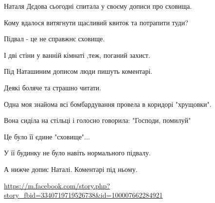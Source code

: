 Наталя  Дєдова сьогодні спитала у своєму дописи про сховища. 

Кому вдалося витягнути щасливий квиток та потрапити туди?

Підвал - це  не справжнє сховище.

І дві стіни у ванній кімнаті ,теж,  поганий захист.

Під Наташиним дописом  люди пишуть коментарі.

Деякі  боляче та страшно читати.

Одна моя знайома всі бомбардування провела в коридорі "хрущовки".

Вона сиділа на стільці і голосно говорила: "Господи, помилуй"

Це було її єдине "сховище"...

У її будинку не було навіть нормального підвалу.

А нижче допис  Наталі. Коментарі під ньому.

\url{https://m.facebook.com/story.php?story_fbid=3340719719526738&id=100007662284921}
